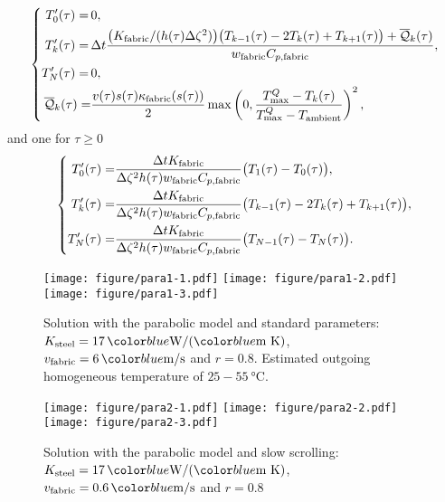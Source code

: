 \begin{equation}
  \left\{
  \begin{aligned}
    T_0'(\tau)
    =\,& 0,
    \\
    T_k'(\tau)
    =\,& \Delta t\dfrac{
    \big(K_{\mathrm{fabric}}/(h(\tau)\Delta\zeta^2)\big) 
    \big(T_{k-1}(\tau)-2T_k(\tau)+T_{k+1}(\tau)\big)
    +\overline{\mathcal{Q}}_k(\tau)
    }{w_{\mathrm{fabric}}C_{p,\textrm{fabric}}},
    \\
    T_N'(\tau)
    =\,& 0,
    \\
    \overline{\mathcal{Q}}_k(\tau)=&
    \dfrac{v(\tau)s(\tau)\kappa_{\mathrm{fabric}}(s(\tau))}{2}
    \max\left(0,\dfrac{{T_{\max}^Q}-T_k(\tau)}{{T_{\max}^Q}-T_{\textrm{ambient}}}\right)^2,
  \end{aligned}
  \right.
\end{equation}
and one for $\tau\geq 0$
\begin{equation}
  \left\{
  \begin{aligned}
    T_0'(\tau)
    =& 
    \dfrac{\Delta tK_{\mathrm{fabric}}}{\Delta\zeta^2h(\tau)w_{\mathrm{fabric}}C_{p,\textrm{fabric}}}
    \big(T_1(\tau)-T_0(\tau)\big),
    \\
    T_k'(\tau)
    =& 
    \dfrac{\Delta tK_{\mathrm{fabric}}}{\Delta\zeta^2h(\tau)w_{\mathrm{fabric}}C_{p,\textrm{fabric}}}
    \big(T_{k-1}(\tau)-2T_k(\tau)+T_{k+1}(\tau)\big),
    \\
    T_N'(\tau)
    =&
    \dfrac{\Delta tK_{\mathrm{fabric}}}{\Delta\zeta^2h(\tau)w_{\mathrm{fabric}}C_{p,\textrm{fabric}}}
    \big(T_{N-1}(\tau)-T_N(\tau)\big).
  \end{aligned}
  \right.
\end{equation}

\begin{figure}[H]
  \begin{center}
    \texttt{[image: figure/para1-1.pdf]}
    \texttt{[image: figure/para1-2.pdf]}
    \texttt{[image: figure/para1-3.pdf]}
  \end{center}
  \caption{Solution with the parabolic model and standard parameters:
  $\Ksteel=17\,\unit{W}/(\unit{m K})$, $\VT=6\,\unit{m/s}$ and $r=0.8$.
  Estimated outgoing homogeneous temperature of $25-55 \ \unit{\celsius}$.}
  \label{fig:para1}
\end{figure}

\begin{figure}[H]
  \begin{center}
    \texttt{[image: figure/para2-1.pdf]}
    \texttt{[image: figure/para2-2.pdf]}
    \texttt{[image: figure/para2-3.pdf]}
  \end{center}
  \caption{Solution with the parabolic model and slow scrolling:
  $\Ksteel=17\,\unit{W}/(\unit{m K})$, $\VT=0.6\,\unit{m/s}$ and $r=0.8$}
  \label{fig:para2}
\end{figure}

